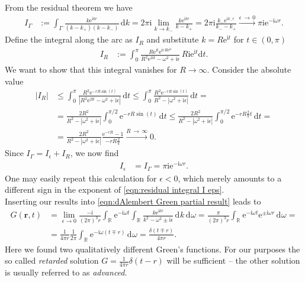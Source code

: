 \documentclass[english, parskip=full]{scrartcl}
\newcommand{\intx}{}
\newcommand{\intr}{}
\newcommand{\kla}{}
\renewcommand{\i}{\text{i}}
\newcommand{\e}{\text{e}}
\begin{document}
From the residual theorem we have
\begin{align}
I_\Gamma &:= \intx\int_{\Gamma }^{ } \frac{k\e^{\i kr}}{(k-k_+)(k-k_-)} \, \mathrm{d}k = 2\pi\i \lim_{k\rightarrow k_-} \frac{k\e^{\i kr}}{k - k_+} = 2\pi\i \frac{k_-\e^{\i k_-r}}{k_- - k_+} \overset{\epsilon\,\rightarrow\,0}{\longrightarrow} \pi\i\e^{-\i\omega r}.
\end{align}
Define the integral along the arc as $I_R$ and substitute $k=R\e^{\i t}$ for $t\in (0,\pi)$
\begin{align}
I_R &:= \intx\int_{0}^{\pi} \frac{R\e^{\i t} \e^{\i rR\e^{\i t}}}{R^2\e^{2\i t} - \omega^2 + \i \epsilon}\, R\i\e^{\i t}\mathrm{d}t.
\end{align}
We want to show that this integral vanishes for $R\rightarrow\infty$.
Consider the absolute value
\begin{align}
|I_R| &\le \intx\int_{0}^{\pi} \frac{R^2\e^{-rR\sin(t)}}{|R^2\e^{2\i t} - \omega^2 + \i\epsilon |}\, \mathrm{d}t \le \intx\int_{0}^{\pi} \frac{R^2\e^{-rR\sin (t)}}{R^2 - |\omega^2 + \i\epsilon|}\, \mathrm{d}t = \\
&= \frac{2R^2}{R^2 - |\omega^2 + \i\epsilon|} \intx\int_{0}^{\pi/2} \e^{-rR\sin(t)}\, \mathrm{d}t \le \frac{2R^2}{R^2 - |\omega^2 + \i\epsilon|} \intx\int_{0}^{\pi/2}\e^{-rR \frac{2}{\pi} t}\, \mathrm{d}t = \\
&= \frac{2R^2}{R^2 - |\omega^2 + \i\epsilon|} \frac{\e^{-rR} - 1}{-rR\frac{2}{\pi}} \overset{R\,\rightarrow\,\infty}{\longrightarrow} 0.
\end{align}
Since $I_\Gamma = I_\epsilon + I_R$, we now find
\begin{align}
I_\epsilon &= I_\Gamma = \pi\i\e^{-\i \omega r}. \label{eqn:residual integral I eps}
\end{align}
One may easily repeat this calculation for $\epsilon < 0$, which merely amounts to a different sign in the exponent of  \autoref{eqn:residual integral I eps}.
\\
Inserting our results into \autoref{eqn:dAlembert Green partial result} leads to
\begin{align}
G(\textbf{r},t) &= \lim_{\epsilon\rightarrow 0} \frac{-\i}{(2\pi)^3 r} \intr\int_{\mathbb{R}^{ }} \e^{-\i\omega t} \intr\int_{\mathbb{R}^{ }} \frac{k\e^{\i kr}}{k^2 - \omega^2 \pm \i\epsilon} \, \mathrm{d}^{ }k \, \mathrm{d}^{ }\omega = \frac{\pi }{(2\pi)^3 r} \intr\int_{\mathbb{R}^{ }} \e^{-\i\omega t} \e^{\pm\i\omega r} \, \mathrm{d}^{ }\omega = \\
&= \frac{1}{4\pi r} \frac{1}{2\pi} \intr\int_{\mathbb{R}^{ }} \e^{-\i \omega\kla\left( t \mp r \right)} \, \mathrm{d}^{ }\omega = \frac{\delta (t\mp r)}{4\pi r}. \label{eqn:dAlembert Green solution}
\end{align}
Here we found two qualitatively different Green's functions.
For our purposes the so called \emph{retarded} solution $G=\frac{1}{4\pi r}\delta (t-r)$ will be sufficient -- the other solution is usually referred to as \emph{advanced}.
\end{document}
